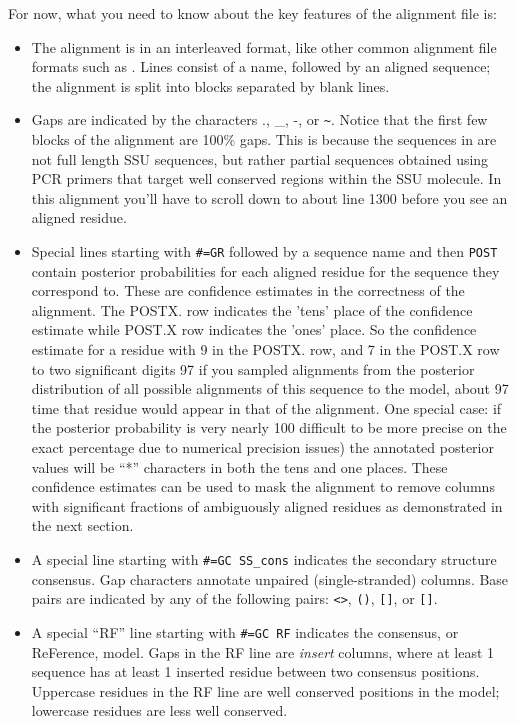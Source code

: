For now, what you need to know about the key features of the alignment file is:
\begin{itemize}

\item The alignment is in an interleaved format, like other
  common alignment file formats such as .
  Lines consist of a name, followed by an aligned sequence;
  the alignment is split into blocks separated by blank lines.

\item Gaps are indicated by the characters ., \_, -, or \verb+~+.
  Notice that the first few blocks of the alignment are 100\% gaps.
  This is because the sequences in  are not full length
  SSU sequences, but rather partial sequences obtained using PCR
  primers that target well conserved regions within the SSU
  molecule. In this alignment you'll have to scroll down to about line
  1300 before you see an aligned residue.

\item Special lines starting with {\small\verb+#=GR+} followed by a
  sequence name and then {\small\verb+POST+} contain posterior
  probabilities for each aligned residue for the sequence they
  correspond to. These are confidence estimates in the correctness of
  the alignment.  The POSTX. row indicates the ’tens’ place of the
  confidence estimate while POST.X row indicates the ’ones’ place. So
  the confidence estimate for a residue with 9 in the POSTX. row, and
  7 in the POST.X row to two significant digits 97%
  if you sampled alignments from the posterior distribution of all
  possible alignments of this sequence to the model, about 97%
  time that residue would appear in that of the alignment. One special
  case: if the posterior probability is very nearly 100%
  difficult to be more precise on the exact percentage due to
  numerical precision issues) the annotated posterior values will be
  ``*'' characters in both the tens and one places. These confidence
  estimates can be used to mask the alignment to remove columns with
  significant fractions of ambiguously aligned residues as demonstrated
  in the next section.

\item A special line starting with {\small\verb+#=GC SS_cons+}
  indicates the secondary structure consensus. Gap characters annotate
  unpaired (single-stranded) columns. Base pairs are indicated by any
  of the following pairs: \verb+<>+, \verb+()+, \verb+[]+, or
  \verb+[]+.

\item A special ``RF'' line starting with {\small\verb+#=GC RF+}
  indicates the consensus, or ReFerence, model. Gaps in the RF line
  are \emph{insert} columns, where at least 1 sequence has at least 1
  inserted residue between two consensus positions. Uppercase residues
  in the RF line are well conserved positions in the model; lowercase
  residues are less well conserved.
\end{itemize}

